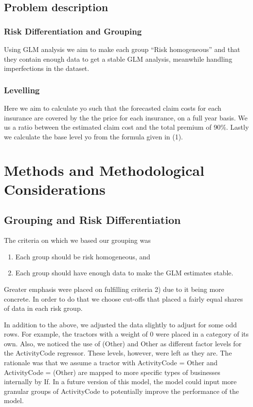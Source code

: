 \documentclass[11pt]{article}
\begin{document}
\subsection{Problem description}
\label{sec:org6c07e77}
\subsubsection{Risk Differentiation and Grouping}
\label{sec:org4c99e88}

Using GLM analysis we aim to make each group “Risk homogeneous” and that they contain enough data to
get a stable GLM analysis, meanwhile handling imperfections in the dataset.

\subsubsection{Levelling}
\label{sec:orgea273d9}

Here we aim to calculate yo such that the forecasted claim costs for each insurance are covered by the
the price for each insurance, on a full year basis. We us a ratio between the estimated claim cost and
the total premium of 90\%. Lastly we calculate the base level yo from the formula given in (1).

\section{Methods and Methodological Considerations}
\label{sec:org6a14cd5}
\subsection{Grouping and Risk Differentiation}
\label{sec:orgf85d4d6}

The criteria on which we based our grouping was

\begin{enumerate}
\item Each group should be risk homogeneous, and
\item Each group should have enough data to make the GLM estimates stable.
\end{enumerate}
Greater emphasis were placed on fulfilling criteria 2) due to it being more concrete. In order to do that
we choose cut-offs that placed a fairly equal shares of data in each risk group. 

In addition to the above, we adjusted the data slightly to adjust for some odd rows. For example, 
the tractors with a weight of 0 were placed in a category of its own. Also, we noticed the use 
of (Other) and Other as different factor levels for the ActivityCode regressor. These levels, however,
were left as they are. The rationale was that we assume a tractor with ActivityCode = Other and
ActivityCode = (Other) are mapped to more specific types of businesses internally by If. In a future version
of this model, the model could input more granular groups of ActivityCode to potentially improve 
the performance of the model.
\end{document}
